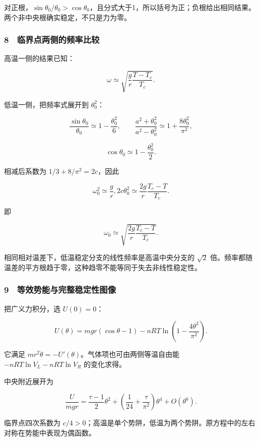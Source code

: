 \documentclass[12pt,a4paper,fontset=fandol]{ctexart}
\begin{document}
对正根，\(\sin\theta_0/\theta_0>\cos\theta_0\)，且分式大于1，所以括号为正；负根给出相同结果。两个非中央根确实稳定，不只是力为零。

\subsubsection{8　临界点两侧的频率比较}\label{ux4e34ux754cux70b9ux4e24ux4fa7ux7684ux9891ux7387ux6bd4ux8f83}

高温一侧的结果已知：

\[\boxed{\omega\simeq\sqrt{\frac gr\frac{T-T_c}{T_c}}.}\]

低温一侧，把频率式展开到 \(\theta_0^2\)：

\[\frac{\sin\theta_0}{\theta_0}\simeq1-\frac{\theta_0^2}{6},\qquad
\frac{a^2+\theta_0^2}{a^2-\theta_0^2}\simeq1+\frac{8\theta_0^2}{\pi^2},\]

\[\cos\theta_0\simeq1-\frac{\theta_0^2}{2}.\]

相减后系数为 \(1/3+8/\pi^2=2c\)，因此

\[\omega_0^2\simeq\frac gr,2c\theta_0^2
\simeq\frac{2g}{r}\frac{T_c-T}{T_c}.\]

即

\[\boxed{\omega_0\simeq\sqrt{\frac{2g}{r}\frac{T_c-T}{T_c}}.}\]

相同相对温差下，低温稳定分支的线性频率是高温中央分支的 \(\sqrt2\)
倍。频率都随温差的平方根趋于零，这种趋零不能等同于失去非线性稳定性。

\subsubsection{9　等效势能与完整稳定性图像}\label{ux7b49ux6548ux52bfux80fdux4e0eux5b8cux6574ux7a33ux5b9aux6027ux56feux50cf}

把广义力积分，选 \(U(0)=0\)：

\[\boxed{U(\theta)=mgr(\cos\theta-1)
-nRT\ln\left(1-\frac{4\theta^2}{\pi^2}\right).}\]

它满足 \(mr^2\ddot\theta=-U'(\theta)\)。气体项也可由两侧等温自由能
\(-nRT\ln V_L-nRT\ln V_R\) 的变化求得。

中央附近展开为

\[\frac{U}{mgr}
=\frac{\tau-1}{2}\theta^2
+\left(\frac1{24}+\frac\tau{\pi^2}\right)\theta^4
+O(\theta^6).\]

临界点四次系数为
\(c/4>0\)；高温是单个势阱，低温为两个势阱。原方程中的左右对称在势能中表现为偶函数。
\end{document}
